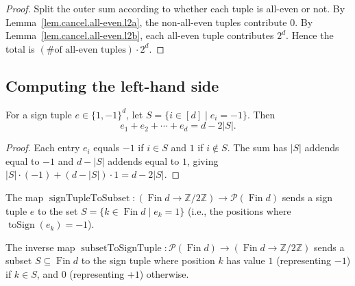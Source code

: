 \begin{proof}
\leanok
Split the outer sum according to whether each tuple is all-even or not.
By Lemma~\ref{lem.cancel.all-even.l2a}, the non-all-even tuples contribute $0$.
By Lemma~\ref{lem.cancel.all-even.l2b}, each all-even tuple contributes $2^d$.
Hence the total is $(\text{\# of all-even tuples}) \cdot 2^d$.
\end{proof}

\subsection{Computing the left-hand side}

\begin{lemma}
\label{lem.cancel.signSum-eq-card}
\leanhelper
\leanok
For a sign tuple $e \in \{1,-1\}^d$, let $S = \{i \in [d] \mid e_i = -1\}$.
Then
\[
e_1 + e_2 + \cdots + e_d = d - 2|S|.
\]
\end{lemma}

\begin{proof}
\leanok
Each entry $e_i$ equals $-1$ if $i \in S$ and $1$ if $i \notin S$.
The sum has $|S|$ addends equal to $-1$ and $d - |S|$ addends equal to $1$,
giving $|S| \cdot (-1) + (d - |S|) \cdot 1 = d - 2|S|$.
\end{proof}

\begin{definition}
\label{def.cancel.signTupleToSubset}
\leanhelper
\leanok
The map $\operatorname{signTupleToSubset} : (\operatorname{Fin} d \to \mathbb{Z}/2\mathbb{Z}) \to \mathcal{P}(\operatorname{Fin} d)$
sends a sign tuple $e$ to the set $S = \{k \in \operatorname{Fin} d \mid e_k = 1\}$
(i.e., the positions where $\operatorname{toSign}(e_k) = -1$).
\end{definition}

\begin{definition}
\label{def.cancel.subsetToSignTuple}
\leanhelper
\leanok
The inverse map $\operatorname{subsetToSignTuple} : \mathcal{P}(\operatorname{Fin} d) \to (\operatorname{Fin} d \to \mathbb{Z}/2\mathbb{Z})$
sends a subset $S \subseteq \operatorname{Fin} d$ to the sign tuple where
position $k$ has value $1$ (representing $-1$) if $k \in S$, and $0$
(representing $+1$) otherwise.
\end{definition}


